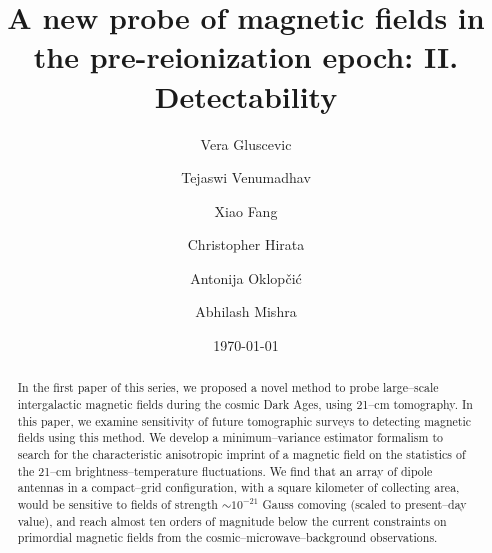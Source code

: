 \documentclass[aps,prd,twocolumn,floatfix,showpacs,superscriptaddress,nofootinbib]{revtex4-1}
\begin{document}
\widetext    
\title{A new probe of magnetic fields in the pre-reionization epoch: II. Detectability}
\author{Vera Gluscevic}
\author{Tejaswi Venumadhav}
\author{Xiao Fang}
\author{Christopher Hirata}
\author{Antonija Oklop\v ci\' c}
\author{Abhilash Mishra} 
\date{\today}
    

\begin{abstract} 
In the first paper of this series, we proposed a novel method to probe large--scale intergalactic magnetic fields during the cosmic Dark Ages, using 21--cm tomography. In this paper, we examine sensitivity of future tomographic surveys to detecting magnetic fields using this method. We develop a minimum--variance estimator formalism to search for the characteristic anisotropic imprint of a magnetic field on the statistics of the 21--cm brightness--temperature fluctuations. We find that an array of dipole antennas in a compact--grid configuration, with a square kilometer of collecting area, would be sensitive to fields of strength $\sim 10^{-21}$ Gauss comoving (scaled to present--day value), and reach almost ten orders of magnitude below the current constraints on primordial magnetic fields from the cosmic--microwave--background observations. 
\end{abstract} 
      
\pacs{} 
\maketitle







  
\appendix 

\label{app:Vrms} 

\label{app:lensing}

\label{app:fesc}



\end{document}
